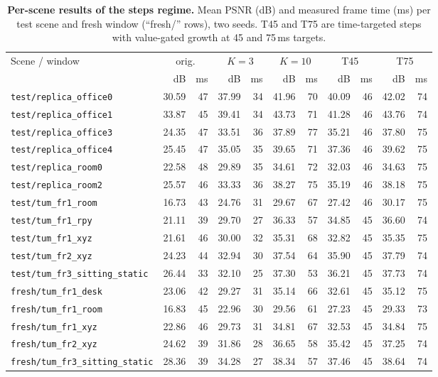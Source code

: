 \begin{table}[t]
\centering
\footnotesize\setlength{\tabcolsep}{3pt}
\begin{tabular}{lrrrrrrrrrr}
\toprule
Scene / window & \multicolumn{2}{c}{orig.} & \multicolumn{2}{c}{$K{=}3$} & \multicolumn{2}{c}{$K{=}10$} & \multicolumn{2}{c}{T45} & \multicolumn{2}{c}{T75} \\
& dB & ms & dB & ms & dB & ms & dB & ms & dB & ms \\
\midrule
\texttt{test/replica\_office0} & 30.59 & 47 & 37.99 & 34 & 41.96 & 70 & 40.09 & 46 & 42.02 & 74 \\
\texttt{test/replica\_office1} & 33.87 & 45 & 39.41 & 34 & 43.73 & 71 & 41.28 & 46 & 43.76 & 74 \\
\texttt{test/replica\_office3} & 24.35 & 47 & 33.51 & 36 & 37.89 & 77 & 35.21 & 46 & 37.80 & 75 \\
\texttt{test/replica\_office4} & 25.45 & 47 & 35.05 & 35 & 39.65 & 71 & 37.36 & 46 & 39.62 & 75 \\
\texttt{test/replica\_room0} & 22.58 & 48 & 29.89 & 35 & 34.61 & 72 & 32.03 & 46 & 34.63 & 75 \\
\texttt{test/replica\_room2} & 25.57 & 46 & 33.33 & 36 & 38.27 & 75 & 35.19 & 46 & 38.18 & 75 \\
\texttt{test/tum\_fr1\_room} & 16.73 & 43 & 24.76 & 31 & 29.67 & 67 & 27.42 & 46 & 30.17 & 75 \\
\texttt{test/tum\_fr1\_rpy} & 21.11 & 39 & 29.70 & 27 & 36.33 & 57 & 34.85 & 45 & 36.60 & 74 \\
\texttt{test/tum\_fr1\_xyz} & 21.61 & 46 & 30.00 & 32 & 35.31 & 68 & 32.82 & 45 & 35.35 & 75 \\
\texttt{test/tum\_fr2\_xyz} & 24.23 & 44 & 32.94 & 30 & 37.54 & 64 & 35.90 & 45 & 37.79 & 74 \\
\texttt{test/tum\_fr3\_sitting\_static} & 26.44 & 33 & 32.10 & 25 & 37.30 & 53 & 36.21 & 45 & 37.73 & 74 \\
\texttt{fresh/tum\_fr1\_desk} & 23.06 & 42 & 29.27 & 31 & 35.14 & 66 & 32.61 & 45 & 35.12 & 75 \\
\texttt{fresh/tum\_fr1\_room} & 16.83 & 45 & 22.96 & 30 & 29.56 & 61 & 27.23 & 45 & 29.33 & 73 \\
\texttt{fresh/tum\_fr1\_xyz} & 22.86 & 46 & 29.73 & 31 & 34.81 & 67 & 32.53 & 45 & 34.84 & 75 \\
\texttt{fresh/tum\_fr2\_xyz} & 24.62 & 39 & 31.86 & 28 & 36.65 & 58 & 35.42 & 45 & 37.25 & 74 \\
\texttt{fresh/tum\_fr3\_sitting\_static} & 28.36 & 39 & 34.28 & 27 & 38.34 & 57 & 37.46 & 45 & 38.64 & 74 \\
\bottomrule
\end{tabular}
\caption{\textbf{Per-scene results of the steps regime.} Mean PSNR (dB) and measured frame time (ms) per test scene and fresh window (``fresh/'' rows), two seeds. T45 and T75 are time-targeted steps with value-gated growth at 45 and 75\,ms targets.}
\label{tab:engineunits}
\end{table}

